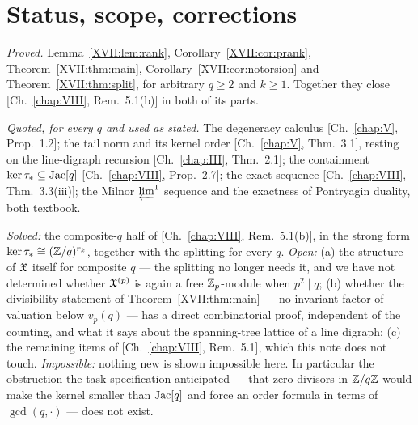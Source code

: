 \section{Status, scope, corrections}\label{XVII:sec:scope}

\emph{Proved.} Lemma~\ref{XVII:lem:rank}, Corollary~\ref{XVII:cor:prank}, Theorem~\ref{XVII:thm:main},
Corollary~\ref{XVII:cor:notorsion} and Theorem~\ref{XVII:thm:split}, for arbitrary $q\ge2$ and
$k\ge1$. Together they close [Ch.~\ref{chap:VIII}, Rem.~5.1(b)] in both of its parts.

\emph{Quoted, for every $q$ and used as stated.} The degeneracy calculus [Ch.~\ref{chap:V}, Prop.~1.2];
the tail norm and its kernel order [Ch.~\ref{chap:V}, Thm.~3.1], resting on the line-digraph recursion
[Ch.~\ref{chap:III}, Thm.~2.1]; the containment $\ker\tau_*\subseteq\operatorname{Jac}[q]$ [Ch.~\ref{chap:VIII}, Prop.~2.7]; the exact
sequence [Ch.~\ref{chap:VIII}, Thm.~3.3(iii)]; the Milnor $\varprojlim^1$ sequence and the exactness of
Pontryagin duality, both textbook.

\begin{remark}\label{XVII:rem:soi}
\emph{Solved:} the composite-$q$ half of [Ch.~\ref{chap:VIII}, Rem.~5.1(b)], in the strong form
$\ker\tau_*\cong(\mathbb{Z}/q)^{r_k}$, together with the splitting for every $q$.
\emph{Open:} (a) the structure of $\mathfrak{X}$ itself for composite $q$ --- the splitting no
longer needs it, and we have not determined whether $\mathfrak{X}^{(p)}$ is again a free
$\mathbb{Z}_p$-module when $p^2\mid q$; (b) whether the divisibility statement of
Theorem~\ref{XVII:thm:main} --- no invariant factor of valuation below $v_p(q)$ --- has a
direct combinatorial proof, independent of the counting, and what it says about the
spanning-tree lattice of a line digraph; (c) the remaining items of [Ch.~\ref{chap:VIII}, Rem.~5.1],
which this note does not touch.
\emph{Impossible:} nothing new is shown impossible here. In particular the obstruction the
task specification anticipated --- that zero divisors in $\mathbb{Z}/q\mathbb{Z}$ would make the kernel
smaller than $\operatorname{Jac}[q]$ and force an order formula in terms of $\gcd(q,\cdot)$ --- does not
exist.
\end{remark}

